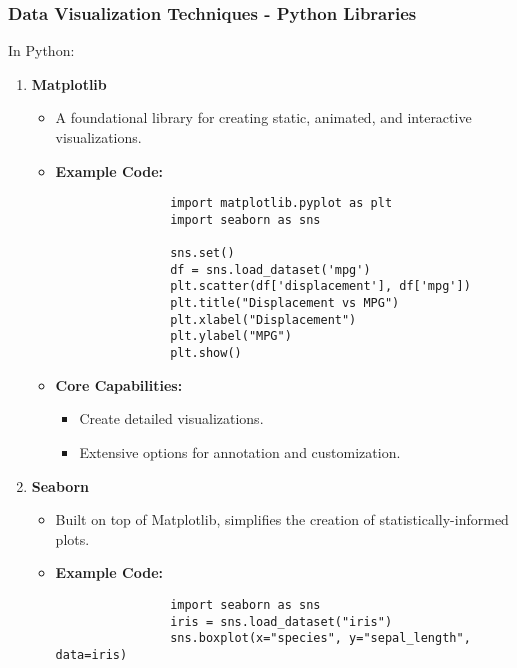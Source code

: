 \documentclass[aspectratio=169]{beamer}
\begin{document}
\begin{frame}[fragile]
    \frametitle{Data Visualization Techniques - Python Libraries}
    \begin{block}{In Python:}
        \begin{enumerate}
            \item \textbf{Matplotlib}
            \begin{itemize}
                \item A foundational library for creating static, animated, and interactive visualizations.
                \item \textbf{Example Code:}
                \begin{lstlisting}
                import matplotlib.pyplot as plt
                import seaborn as sns
                
                sns.set()
                df = sns.load_dataset('mpg')
                plt.scatter(df['displacement'], df['mpg'])
                plt.title("Displacement vs MPG")
                plt.xlabel("Displacement")
                plt.ylabel("MPG")
                plt.show()
                \end{lstlisting}
                \item \textbf{Core Capabilities:}
                \begin{itemize}
                    \item Create detailed visualizations.
                    \item Extensive options for annotation and customization.
                \end{itemize}
            \end{itemize}
            \item \textbf{Seaborn}
            \begin{itemize}
                \item Built on top of Matplotlib, simplifies the creation of statistically-informed plots.
                \item \textbf{Example Code:}
                \begin{lstlisting}
                import seaborn as sns
                iris = sns.load_dataset("iris")
                sns.boxplot(x="species", y="sepal_length", data=iris)
                \end{lstlisting}
            \end{itemize}
        \end{enumerate}
    \end{block}
\end{frame}
\end{document}
